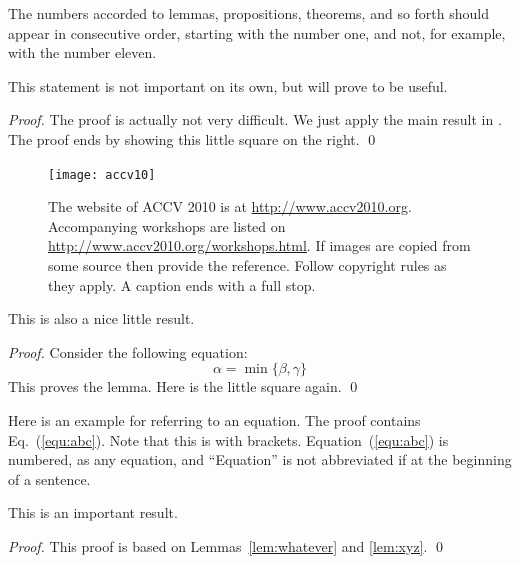 \documentclass[runningheads]{llncs}
\begin{document}
The numbers accorded to lemmas, propositions, theorems, and so forth should
appear in consecutive order, starting with the number one, and not, for
example, with the number eleven.

\begin{lemma}
This statement is not important on its own, but will prove to be useful.
\label{lem:whatever}
\end{lemma}

\begin{proof}
The proof is actually not very difficult. We just apply the main result in \cite{Alpher03}.
The proof ends by showing this little square on the right.
\qed
\end{proof}

\begin{figure}[b]
\centering
\texttt{[image: accv10]}
\caption{
The website of ACCV 2010 is at \url{http://www.accv2010.org}. Accompanying
workshops are listed on \url{http://www.accv2010.org/workshops.html}. 
If images are copied from some source then provide the reference.
Follow copyright rules as they apply. A caption ends with a full stop.
}
\label{fig:accv10}
\end{figure}

\begin{lemma}
This is also a nice little result.
\label{lem:xyz}
\end{lemma}

\begin{proof}
Consider the following equation:
%
\begin{equation}
\alpha = \min \{\beta, \gamma \}
\label{equ:abc}
\end{equation}
%
This proves the lemma. Here is the little square again.
\qed
\end{proof}

Here is an example for referring to an equation. The proof contains Eq.~(\ref{equ:abc}).
Note that this is with brackets. Equation~(\ref{equ:abc}) is numbered, as any equation, and
``Equation'' is not abbreviated if at the beginning of a sentence.

\begin{theorem} 
This is an important result.
\end{theorem}

\begin{proof}
This proof is based on Lemmas~\ref{lem:whatever} and \ref{lem:xyz}. 
\qed
\end{proof}

\end{document}
